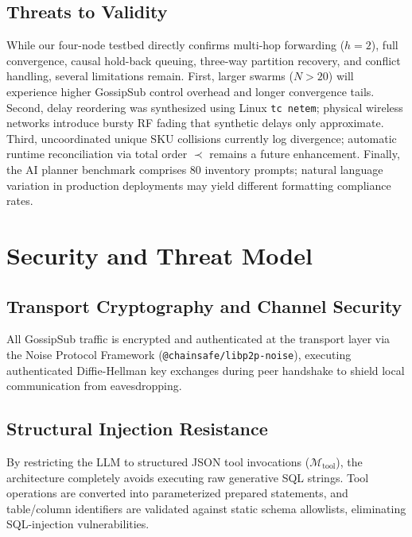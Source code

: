 \subsection{Threats to Validity}
\label{sec:threats}
While our four-node testbed directly confirms multi-hop forwarding ($h=2$), full convergence, causal hold-back queuing, three-way partition recovery, and conflict handling, several limitations remain. First, larger swarms ($N > 20$) will experience higher GossipSub control overhead and longer convergence tails. Second, delay reordering was synthesized using Linux \texttt{tc netem}; physical wireless networks introduce bursty RF fading that synthetic delays only approximate. Third, uncoordinated unique SKU collisions currently log divergence; automatic runtime reconciliation via total order $\prec$ remains a future enhancement. Finally, the AI planner benchmark comprises 80 inventory prompts; natural language variation in production deployments may yield different formatting compliance rates.

\section{Security and Threat Model}
\label{sec:security}

\subsection{Transport Cryptography and Channel Security}
All GossipSub traffic is encrypted and authenticated at the transport layer via the Noise Protocol Framework (\texttt{@chainsafe/libp2p-noise}), executing authenticated Diffie-Hellman key exchanges during peer handshake to shield local communication from eavesdropping.

\subsection{Structural Injection Resistance}
By restricting the LLM to structured JSON tool invocations ($\mathcal{M}_{\text{tool}}$), the architecture completely avoids executing raw generative SQL strings. Tool operations are converted into parameterized prepared statements, and table/column identifiers are validated against static schema allowlists, eliminating SQL-injection vulnerabilities.

